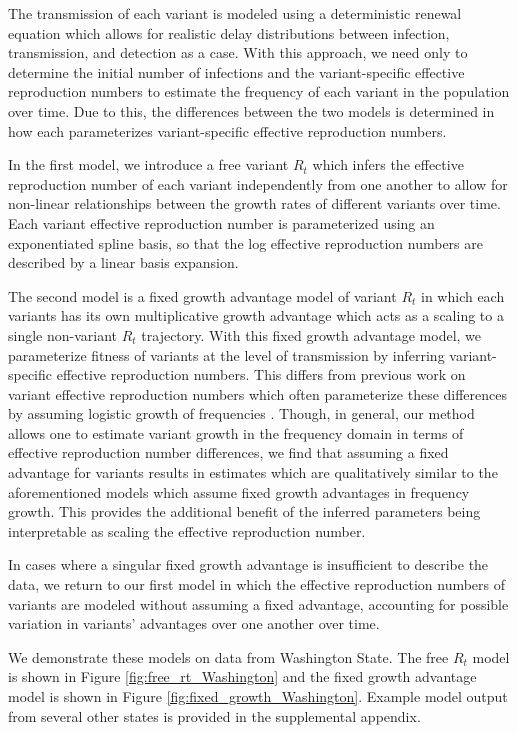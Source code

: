 \documentclass[11pt,oneside,letterpaper]{article}
\begin{document}
The transmission of each variant is modeled using a deterministic renewal equation which allows for realistic delay distributions between infection, transmission, and detection as a case.
With this approach, we need only to determine the initial number of infections and the variant-specific effective reproduction numbers to estimate the frequency of each variant in the population over time.
Due to this, the differences between the two models is determined in how each parameterizes variant-specific effective reproduction numbers.

In the first model, we introduce a free variant $R_{t}$ which infers the effective reproduction number of each variant independently from one another to allow for non-linear relationships between the growth rates of different variants over time.
Each variant effective reproduction number is parameterized using an exponentiated spline basis, so that the log effective reproduction numbers are described by a linear basis expansion.

The second model is a fixed growth advantage model of variant $R_{t}$ in which each variants has its own multiplicative growth advantage which acts as a scaling to a single non-variant $R_{t}$ trajectory.
With this fixed growth advantage model, we parameterize fitness of variants at the level of transmission by inferring variant-specific effective reproduction numbers.
This differs from previous work on variant effective reproduction numbers which often parameterize these differences by assuming logistic growth of frequencies \cite{Earnest2021, Vhringer2021}.
Though, in general, our method allows one to estimate variant growth in the frequency domain in terms of effective reproduction number differences, we find that assuming a fixed advantage for variants results in estimates which are qualitatively similar to the aforementioned models which assume fixed growth advantages in frequency growth.
This provides the additional benefit of the inferred parameters being interpretable as scaling the effective reproduction number.

In cases where a singular fixed growth advantage is insufficient to describe the data, we return to our first model in which the effective reproduction numbers of variants are modeled without assuming a fixed advantage, accounting for possible variation in variants' advantages over one another over time.

We demonstrate these models on data from Washington State.
The free $R_{t}$ model is shown in Figure \ref{fig:free_rt_Washington} and the fixed growth advantage model is shown in Figure \ref{fig:fixed_growth_Washington}. Example model output from several other states is provided in the supplemental appendix.
\end{document}
